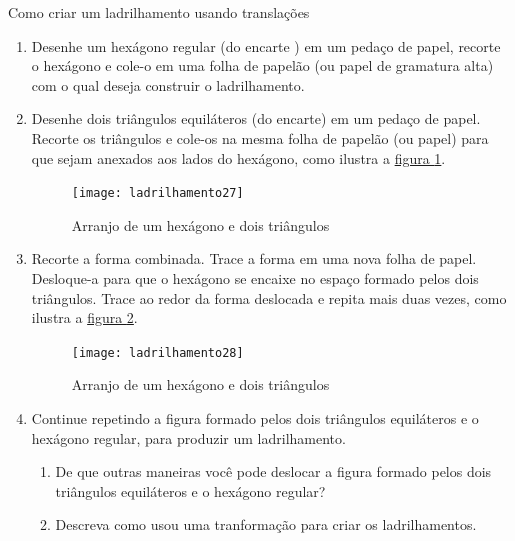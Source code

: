 \begin{task}{Como criar um ladrilhamento usando translações}

\begin{enumerate}
	\item Desenhe um hexágono regular (do encarte ) em um pedaço de papel, recorte o hexágono e cole-o em uma folha de papelão (ou papel de gramatura  alta) com o qual deseja construir o ladrilhamento.
	\item Desenhe dois triângulos equiláteros (do encarte) em um pedaço de papel. Recorte os triângulos e cole-os na mesma folha de papelão (ou papel) para que sejam anexados aos lados do hexágono, como ilustra a \hyperref[transf1]{figura \ref{transf1}}.

	\begin{figure}[H]
	\centering
	\texttt{[image: ladrilhamento27]}
	\caption{Arranjo de um hexágono e dois triângulos}
	\label{transf1}
	\end{figure}

	\item Recorte a forma combinada. Trace a forma em uma nova folha de papel. Desloque-a para que o hexágono se encaixe no espaço formado pelos dois triângulos. Trace ao redor da forma deslocada e repita mais duas vezes, como ilustra a \hyperref[transf2]{figura \ref{transf2}}.

	\begin{figure}[H]
	\centering
	\texttt{[image: ladrilhamento28]}
	\caption{Arranjo de um hexágono e dois triângulos}
	\label{transf2}
	\end{figure}
	
\item Continue repetindo a figura formado pelos dois triângulos equiláteros e o hexágono regular, para produzir um ladrilhamento.	
	
	\begin{enumerate}
		\item De que outras maneiras você pode deslocar a figura formado pelos dois triângulos equiláteros e o hexágono regular?
		
	\item Descreva como usou uma tranformação para criar os ladrilhamentos.

\end{enumerate}
\end{enumerate}
\end{task}

